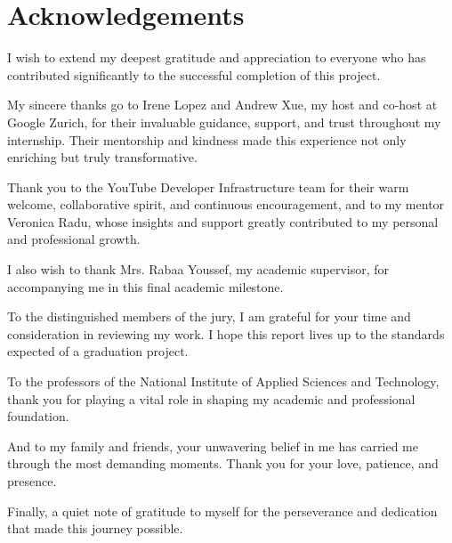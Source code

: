 \chapter*{Acknowledgements}

I wish to extend my deepest gratitude and appreciation to everyone who has contributed significantly to the successful completion of this project.

My sincere thanks go to Irene Lopez and Andrew Xue, my host and co-host at Google Zurich, for their invaluable guidance, support, and trust throughout my internship. Their mentorship and kindness made this experience not only enriching but truly transformative.

Thank you to the YouTube Developer Infrastructure team for their warm welcome, collaborative spirit, and continuous encouragement, and to my mentor Veronica Radu, whose insights and support greatly contributed to my personal and professional growth.

I also wish to thank Mrs. Rabaa Youssef, my academic supervisor, for accompanying me in this final academic milestone.

To the distinguished members of the jury, I am grateful for your time and consideration in reviewing my work. I hope this report lives up to the standards expected of a graduation project.

To the professors of the National Institute of Applied Sciences and Technology, thank you for playing a vital role in shaping my academic and professional foundation.

And to my family and friends, your unwavering belief in me has carried me through the most demanding moments. Thank you for your love, patience, and presence.

Finally, a quiet note of gratitude to myself for the perseverance and dedication that made this journey possible.